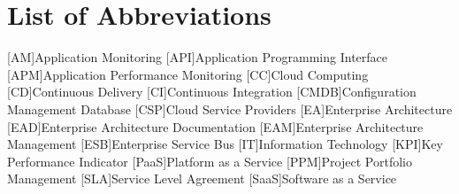 
\chapter*{List of Abbreviations}

\begin{acronym}[ewuifbwejkbfjksbjkcbsdjcjkn3j]%
[AM]{Application Monitoring}
[API]{Application Programming Interface}
[APM]{Application Performance Monitoring}
[CC]{Cloud Computing}
[CD]{Continuous Delivery}
[CI]{Continuous Integration}
[CMDB]{Configuration Management Database}
[CSP]{Cloud Service Providers}
[EA]{Enterprise Architecture}
[EAD]{Enterprise Architecture Documentation}
[EAM]{Enterprise Architecture Management}
[ESB]{Enterprise Service Bus}
[IT]{Information Technology}
[KPI]{Key Performance Indicator}
[PaaS]{Platform as a Service}
[PPM]{Project Portfolio Management}
[SLA]{Service Level Agreement}
[SaaS]{Software as a Service}

%


\end{acronym}
